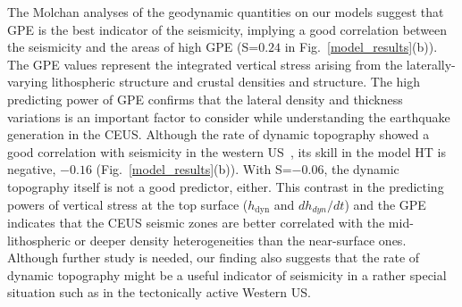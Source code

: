 \documentclass[draft,linenumbers]{agujournal2018}
\begin{document}
The Molchan analyses of the geodynamic quantities on our models suggest that GPE is the best indicator of the seismicity, implying a good correlation between the seismicity and the areas of high GPE (S=$0.24$ in Fig.~\ref{model_results}(b)). 
% 
The GPE values represent the integrated vertical stress arising from the laterally-varying lithospheric structure and crustal densities and structure. The high predicting power of GPE confirms that the lateral density and thickness variations is an important factor to consider while understanding the earthquake generation in the CEUS.   Although the rate of dynamic topography showed a good correlation with seismicity in the western US~\citep{becker2015western}, its skill in the model HT is negative, $-0.16$ (Fig.~\ref{model_results}(b)). With S=$-0.06$, the dynamic topography itself is not a good predictor, either. This contrast in the predicting powers of vertical stress at the top surface ($h_{\text{dyn}}$ and $dh_{dyn}/dt$)  and the GPE indicates that the CEUS seismic zones are better correlated with the mid-lithospheric or deeper density heterogeneities than the near-surface ones. Although further study is needed, our finding also suggests that the rate of dynamic topography might be a useful indicator of seismicity in a rather special situation such as in the tectonically active Western US. 
\end{document}
